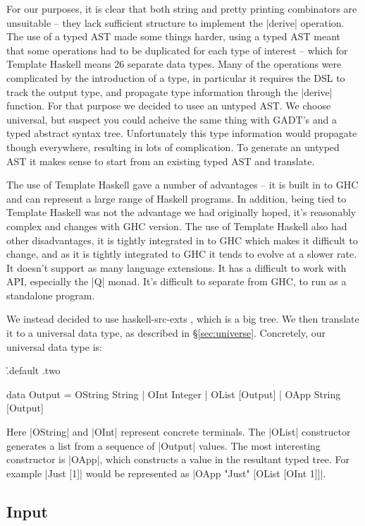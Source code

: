\documentclass[preprint,draft]{sigplanconf}
\begin{document}
For our purposes, it is clear that both string and pretty printing combinators are unsuitable -- they lack sufficient structure to implement the |derive| operation. The use of a typed AST made some things harder, using a typed AST meant that some operations had to be duplicated for each type of interest -- which for Template Haskell means 26 separate data types. Many of the operations were complicated by the introduction of a type, in particular it requires the DSL to track the output type, and propagate type information through the |derive| function. For that purpose we decided to usee an untyped AST. We choose universal, but suspect you could acheive the same thing with GADT's and a typed abstract syntax tree. Unfortunately this type information would propagate though everywhere, resulting in lots of complication. To generate an untyped AST it makes sense to start from an existing typed AST and translate.

The use of Template Haskell gave a number of advantages -- it is built in to GHC and can represent a large range of Haskell programs. In addition, being tied to Template Haskell was not the advantage we had originally hoped, it's reasonably complex and changes with GHC version. The use of Template Haskell also had other disadvantages, it is tightly integrated in to GHC which makes it difficult to change, and as it is tightly integrated to GHC it tends to evolve at a slower rate. It doesn't support as many language extensions. It has a difficult to work with API, especially the |Q| monad. It's difficult to separate from GHC, to run as a standalone program.

We instead decided to use haskell-src-exts \cite{haskell_src_exts}, which is a big tree. We then translate it to a universal data type, as described in \S\ref{sec:universe}. Concretely, our universal data type is:

\h{.default .two}\begin{code}
data Output  =  OString String
             |  OInt Integer
             |  OList [Output]
             |  OApp String [Output]
\end{code}

Here |OString| and |OInt| represent concrete terminals. The |OList| constructor generates a list from a sequence of  |Output| values. The most interesting constructor is |OApp|, which constructs a value in the resultant typed tree. For example |Just [1]| would be represented as |OApp "Just" [OList [OInt 1]]|.

\subsection{Input}
\end{document}
